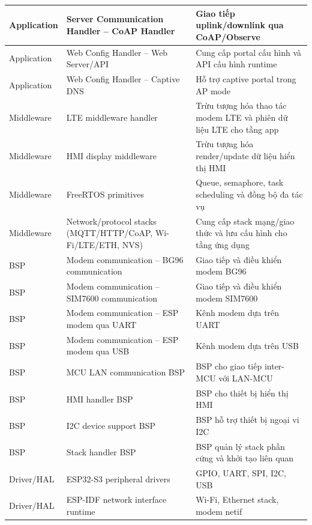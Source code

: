 \begin{longtable}{|p{}|p{}|p{}|}
                Application & Server Communication Handler -- CoAP Handler & Giao tiếp uplink/downlink qua CoAP/Observe \\ \hline
                Application & Web Config Handler -- Web Server/API & Cung cấp portal cấu hình và API cấu hình runtime \\ \hline
                Application & Web Config Handler -- Captive DNS & Hỗ trợ captive portal trong AP mode \\ \hline
                Middleware & LTE middleware handler & Trừu tượng hóa thao tác modem LTE và phiên dữ liệu LTE cho tầng app \\ \hline
                Middleware & HMI display middleware & Trừu tượng hóa render/update dữ liệu hiển thị HMI \\ \hline
                Middleware & FreeRTOS primitives & Queue, semaphore, task scheduling và đồng bộ đa tác vụ \\ \hline
                Middleware & Network/protocol stacks (MQTT/HTTP/CoAP, Wi-Fi/LTE/ETH, NVS) & Cung cấp stack mạng/giao thức và lưu cấu hình cho tầng ứng dụng \\ \hline
                BSP & Modem communication -- BG96 communication & Giao tiếp và điều khiển modem BG96 \\ \hline
                BSP & Modem communication -- SIM7600 communication & Giao tiếp và điều khiển modem SIM7600 \\ \hline
                BSP & Modem communication -- ESP modem qua UART & Kênh modem dựa trên UART \\ \hline
                BSP & Modem communication -- ESP modem qua USB & Kênh modem dựa trên USB \\ \hline
                BSP & MCU LAN communication BSP & BSP cho giao tiếp inter-MCU với LAN-MCU \\ \hline
                BSP & HMI handler BSP & BSP cho thiết bị hiển thị HMI \\ \hline
                BSP & I2C device support BSP & BSP hỗ trợ thiết bị ngoại vi I2C \\ \hline
                BSP & Stack handler BSP & BSP quản lý stack phần cứng và khởi tạo liên quan \\ \hline
                Driver/HAL & ESP32-S3 peripheral drivers & GPIO, UART, SPI, I2C, USB \\ \hline
                Driver/HAL & ESP-IDF network interface runtime & Wi-Fi, Ethernet stack, modem netif \\ \hline
            \end{longtable}
        
